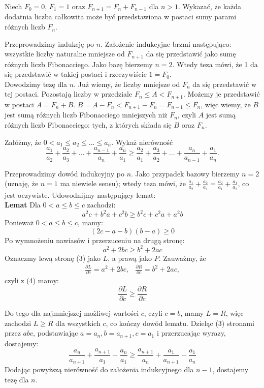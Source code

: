 \documentclass{../note}
\begin{document}
\begin{zadanie}{3}
Niech $F_{0}=0$, $F_{1}=1$ oraz $F_{n+1}=F_{n}+F_{n-1}$ dla $n > 1$. Wykazać, że każda dodatnia liczba całkowita może być przedstawiona w postaci sumy parami różnych liczb $F_{n}$.
\end{zadanie}
\begin{rozwiazanie}
Przeprowadzimy indukcję po $n$. Założenie indukcyjne brzmi następująco: wszystkie liczby naturalne mniejsze od $F_{n+1}$ da się przedstawić jako sumę różnych liczb Fibonacciego. Jako bazę bierzemy $n=2$. Wtedy teza mówi, że 1 da się przedstawić w takiej postaci i rzeczywiście $1 = F_0$.\\
Dowodzimy tezę dla $n$. Już wiemy, że liczby mniejsze od $F_n$ da się przedstawić w tej postaci. Pozostają liczby w przedziale $F_n \leq A < F_{n+1}$. Możemy je przedstawić w postaci $A = F_n + B$. $B = A - F_n < F_{n+1} - F_n = F_{n-1} \leq F_n$, więc wiemy, że $B$ jest sumą różnych liczb Fibonacciego mniejszych niż $F_n$, czyli $A$ jest sumą różnych liczb Fibonacciego: tych, z których składa się $B$ oraz $F_n$.
\end{rozwiazanie}

\begin{zadanie}{4}
Załóżmy, że $0<a_{1}\le a_{2}\le...\le a_{n}$. Wykaż nierówność
\[\frac{a_{1}}{a_{2}}+\frac{a_{2}}{a_{3}}+...+\frac{a_{n-1}}{a_{n}}+\frac{a_{n}}{a_{1}}\ge\frac{a_{2}}{a_{1}}+\frac{a_{3}}{a_{2}}+...+\frac{a_{n}}{a_{n-1}}+\frac{a_{1}}{a_{n}}.\]
\end{zadanie}
\begin{rozwiazanie}
Przeprowadzimy dowód indukcyjny po $n$. Jako przypadek bazowy bierzemy $n=2$ (uznaję, że $n=1$ ma niewiele sensu); wtedy teza mówi, że $\frac{a_1}{a_2} + \frac{a_2}{a_1} = \frac{a_2}{a_1} + \frac{a_1}{a_2}$, co jest oczywiste. Udowodnijmy następujący lemat:\\
\textbf{Lemat} Dla $0 < a \leq b \leq c$ zachodzi:
\begin{equation}
a^2c + b^2a + c^2b \geq b^2c + c^2a + a^2b
\end{equation}
Ponieważ $0 < a \leq b \leq c$, mamy:
\[(2c - a - b)(b - a) \geq 0\]
Po wymnożeniu nawiasów i przerzuceniu na drugą stronę:
\begin{equation}
a^2 + 2bc \geq b^2 + 2ac
\end{equation}
Oznaczmy lewą stronę (3) jako $L$, a prawą jako $P$. Zauważmy, że
\begin{align*}
\frac{\partial L}{\partial c} = a^2 + 2bc, & \frac{\partial R}{\partial c} = b^2 + 2ac,
\end{align*}
czyli z (4) mamy:
\[\frac{\partial L}{\partial c} \geq \frac{\partial R}{\partial c}\]
\end{rozwiazanie}
Do tego dla najmniejszej możliwej wartości $c$, czyli $c = b$, mamy $L = R$, więc zachodzi $L \geq R$ dla wszystkich $c$, co kończy dowód lematu. Dzieląc (3) stronami przez $abc$, podstawiając $a = a_n, b = a_{n+1}, c = a_1$ i przerzucając wyrazy, dostajemy:
\[\frac{a_n}{a_{n+1}} + \frac{a_{n+1}}{a_1} - \frac{a_n}{a_1} \geq \frac{a_{n+1}}{a_n} + \frac{a_1}{a_{n+1}} - \frac{a_1}{a_n}\]
Dodając powyższą nierówność do założenia indukcyjnego dla $n - 1$, dostajemy tezę dla $n$.
\end{document}
